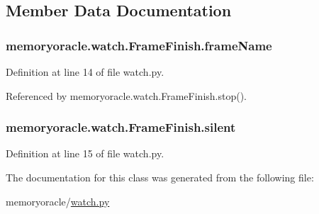 \subsection{Member Data Documentation}
\hypertarget{classmemoryoracle_1_1watch_1_1FrameFinish_a14597fb9b29e7ebb6df3e1c415875365}{}
\subsubsection[{frame\+Name}]{\setlength{\rightskip}{0pt plus 5cm}memoryoracle.\+watch.\+Frame\+Finish.\+frame\+Name}\label{classmemoryoracle_1_1watch_1_1FrameFinish_a14597fb9b29e7ebb6df3e1c415875365}


Definition at line 14 of file watch.\+py.



Referenced by memoryoracle.\+watch.\+Frame\+Finish.\+stop().

\hypertarget{classmemoryoracle_1_1watch_1_1FrameFinish_a17cb727761c42da3ef546aaa3c6cad4d}{}
\subsubsection[{silent}]{\setlength{\rightskip}{0pt plus 5cm}memoryoracle.\+watch.\+Frame\+Finish.\+silent}\label{classmemoryoracle_1_1watch_1_1FrameFinish_a17cb727761c42da3ef546aaa3c6cad4d}


Definition at line 15 of file watch.\+py.



The documentation for this class was generated from the following file\+:\begin{DoxyCompactItemize}
\item 
memoryoracle/\hyperlink{watch_8py}{watch.\+py}\end{DoxyCompactItemize}
